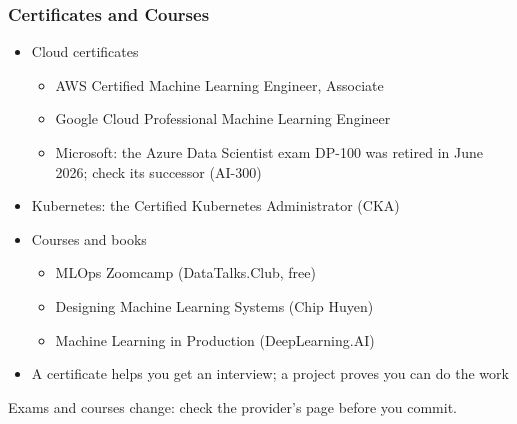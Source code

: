 \begin{frame}[fragile]\frametitle{Certificates and Courses}
\begin{itemize}
\item Cloud certificates
\begin{itemize}
\item AWS Certified Machine Learning Engineer, Associate
\item Google Cloud Professional Machine Learning Engineer
\item Microsoft: the Azure Data Scientist exam DP-100 was retired in June 2026; check its successor (AI-300)
\end{itemize}
\item Kubernetes: the Certified Kubernetes Administrator (CKA)
\item Courses and books
\begin{itemize}
\item MLOps Zoomcamp (DataTalks.Club, free)
\item Designing Machine Learning Systems (Chip Huyen)
\item Machine Learning in Production (DeepLearning.AI)
\end{itemize}
\item A certificate helps you get an interview; a project proves you can do the work
\end{itemize}

{\tiny Exams and courses change: check the provider's page before you commit.}
\end{frame}
